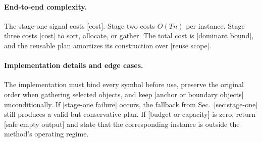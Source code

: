\paragraph{End-to-end complexity.}
The stage-one signal costs [cost]. Stage two costs $O(Tn)$ per instance. Stage three costs [cost] to sort, allocate, or gather. The total cost is [dominant bound], and the reusable plan amortizes its construction over [reuse scope].

\paragraph{Implementation details and edge cases.}
The implementation must bind every symbol before use, preserve the original order when gathering selected objects, and keep [anchor or boundary objects] unconditionally. If [stage-one failure] occurs, the fallback from Sec.~\ref{sec:stage-one} still produces a valid but conservative plan. If [budget or capacity] is zero, return [safe empty output] and state that the corresponding instance is outside the method's operating regime.
